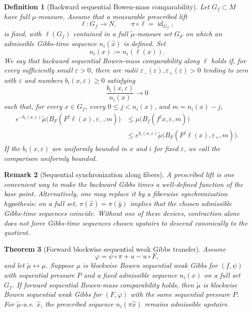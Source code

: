 \documentclass[11pt,a4paper]{article}
\newtheorem{theorem}{Theorem}[section]
\newtheorem{remark}[theorem]{Remark}
\newtheorem{definition}[theorem]{Definition}
\newcommand{\eps}{\varepsilon}
\begin{document}
\begin{definition}[Backward sequential Bowen-mass comparability]
\label{def:sequential-backward-comparison}
Let $G_f\subset M$ have full $\mu$-measure. Assume that a measurable
prescribed lift
\[
 \ell:G_f\to N,
 \qquad \pi\circ\ell=\operatorname{id}_{G_f},
\]
is fixed, with $\ell(G_f)$ contained in a full $\widetilde\mu$-measure set
$G_F$ on which an admissible Gibbs-time sequence $n_i(\hat x)$ is defined.
Set
\[
 n_i(x):=n_i(\ell(x)).
\]
We say that \emph{backward sequential Bowen-mass comparability along $\ell$}
holds if, for every sufficiently small $\eps>0$, there are radii
$\eps_-(\eps),\eps_+(\eps)>0$ tending to zero with $\eps$ and numbers
$b_i(x,\eps)\ge0$ satisfying
\[
 \frac{b_i(x,\eps)}{n_i(x)}\longrightarrow0
\]
such that, for every $x\in G_f$, every $0\le j<n_i(x)$, and
$m=n_i(x)-j$,
\begin{align}
 e^{-b_i(x,\eps)}
 \widetilde\mu\bigl(B_F(F^j\ell(x),\eps_-,m)\bigr)
 &\le \mu\bigl(B_f(f^jx,\eps,m)\bigr)
 \nonumber\\
 &\le e^{b_i(x,\eps)}
 \widetilde\mu\bigl(B_F(F^j\ell(x),\eps_+,m)\bigr).
 \label{eq:seq-backward-comparison}
\end{align}
If the $b_i(x,\eps)$ are uniformly bounded in $x$ and $i$ for fixed
$\eps$, we call the comparison \emph{uniformly bounded}.
\end{definition}

\begin{remark}[Sequential synchronization along fibers]
A prescribed lift is one convenient way to make the backward Gibbs times a
well-defined function of the base point. Alternatively, one may replace it by
a \emph{fiberwise synchronization hypothesis}: on a full set,
$\pi(\hat x)=\pi(\hat y)$ implies that the chosen admissible Gibbs-time
sequences coincide. Without one of these devices, contraction alone does not
force Gibbs-time sequences chosen upstairs to descend canonically to the
quotient.
\end{remark}

\begin{theorem}[Forward blockwise sequential weak Gibbs transfer]
\label{thm:sequential-weak-forward}
Assume
\[
 \varphi=\psi\circ\pi+u-u\circ F,
\]
and let $\widetilde\mu\leftrightarrow\mu$. Suppose $\mu$ is blockwise Bowen
sequential weak Gibbs for $(f,\psi)$ with sequential pressure $P$ and a fixed
admissible sequence $n_i(x)$ on a full set $G_f$. If forward sequential
Bowen-mass comparability holds, then $\widetilde\mu$ is blockwise Bowen
sequential weak Gibbs for $(F,\varphi)$ with the same sequential pressure $P$.
For $\widetilde\mu$-a.e. $\hat x$, the prescribed sequence
$n_i(\pi\hat x)$ remains admissible upstairs.
\end{theorem}
\end{document}
